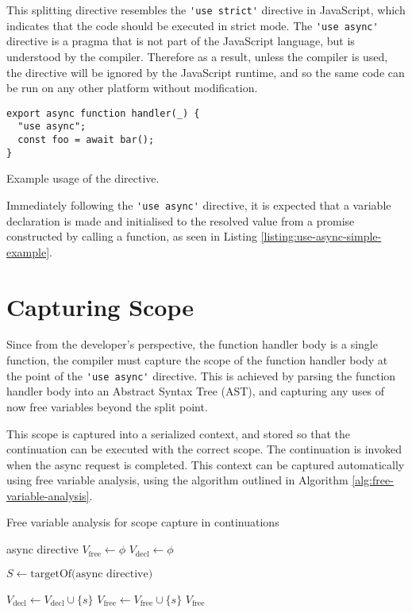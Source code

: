 This splitting directive resembles the \verb|'use strict'| directive in JavaScript, which indicates that the code should be executed in strict mode. The \verb|'use async'| directive is a pragma that is not part of the JavaScript language, but is understood by the \faaasc{} compiler. Therefore as a result, unless the \faaasc{} compiler is used, the directive will be ignored by the JavaScript runtime, and so the same code can be run on any other \faas{} platform without modification.

\begin{listing}[H]
\begin{verbatim}
export async function handler(_) {
  "use async";
  const foo = await bar();
}
\end{verbatim}
\caption{Example usage of the directive.}
\label{listing:use-async-simple-example}
\end{listing}

Immediately following the \verb|'use async'| directive, it is expected that a variable declaration is made and initialised to the resolved value from a promise constructed by calling a function, as seen in Listing \ref{listing:use-async-simple-example}.

\section{Capturing Scope}
Since from the developer's perspective, the function handler body is a single function, the \faaasc{} compiler must capture the scope of the function handler body at the point of the \verb|'use async'| directive. This is achieved by parsing the function handler body into an Abstract Syntax Tree (AST), and capturing any uses of now free variables beyond the split point.

This scope is captured into a serialized context, and stored so that the continuation can be executed with the correct scope. The continuation is invoked when the async request is completed. This context can be captured automatically using free variable analysis, using the algorithm outlined in Algorithm \ref{alg:free-variable-analysis}.

\begin{algorithm}
\caption{Free variable analysis for scope capture in continuations}
\label{alg:free-variable-analysis}
\begin{algorithmic}[1]
\Require async directive
\State $V_\mathrm{free} \gets \phi$
\State $V_\mathrm{decl} \gets \phi$

\State $S \gets \textrm{targetOf(async directive)}$

        \State $V_\mathrm{decl} \gets V_\mathrm{decl} \cup \{s\}$
            \State $V_\mathrm{free} \gets V_\mathrm{free} \cup \{s\}$
        \EndIf
    \EndIf
\EndFor
\Ensure $V_\mathrm{free}$
\end{algorithmic}
\end{algorithm}

